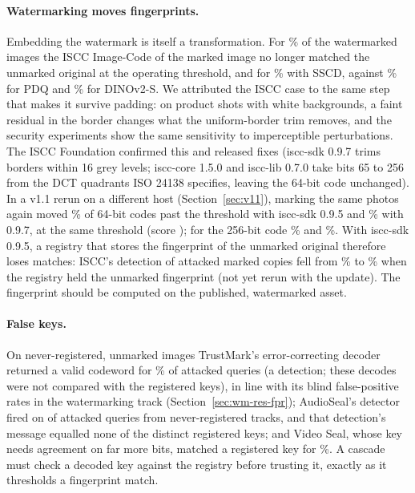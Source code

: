 \paragraph{Watermarking moves fingerprints.} Embedding the watermark is itself a transformation. For \% of the watermarked images the ISCC Image-Code of the marked image no longer matched the unmarked original at the operating threshold, and for \% with SSCD, against \% for PDQ and \% for DINOv2-S. We attributed the ISCC case to the same step that makes it survive padding: on product shots with white backgrounds, a faint residual in the border changes what the uniform-border trim removes, and the security experiments show the same sensitivity to imperceptible perturbations. The ISCC Foundation confirmed this and released fixes (iscc-sdk 0.9.7 trims borders within 16 grey levels; iscc-core 1.5.0 and iscc-lib 0.7.0 take bits 65 to 256 from the DCT quadrants ISO 24138 specifies, leaving the 64-bit code unchanged). In a v1.1 rerun on a different host (Section~\ref{sec:v11}), marking the same  photos again moved \% of 64-bit codes past the threshold with iscc-sdk 0.9.5 and \% with 0.9.7, at the same threshold (score ); for the 256-bit code \% and \%. With iscc-sdk 0.9.5, a registry that stores the fingerprint of the unmarked original therefore loses matches: ISCC's detection of attacked marked copies fell from \% to \% when the registry held the unmarked fingerprint (not yet rerun with the update). The fingerprint should be computed on the published, watermarked asset.

\paragraph{False keys.} On never-registered, unmarked images TrustMark's error-correcting decoder returned a valid codeword for \% of  attacked queries (a detection; these decodes were not compared with the registered keys), in line with its blind false-positive rates in the watermarking track (Section~\ref{sec:wm-res-fpr}); AudioSeal's detector fired on  of  attacked queries from  never-registered tracks, and that detection's message equalled none of the  distinct registered keys; and Video Seal, whose key needs agreement on far more bits, matched a registered key for \%. A cascade must check a decoded key against the registry before trusting it, exactly as it thresholds a fingerprint match.

